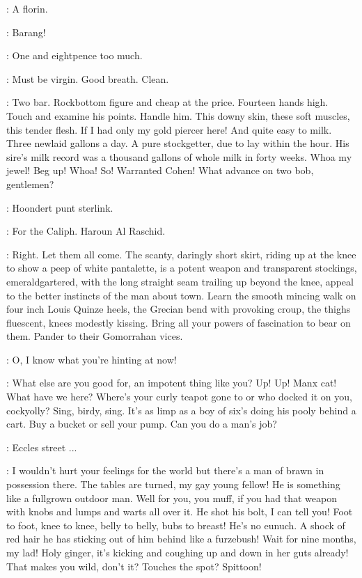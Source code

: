 \Bidder:
A florin.


\Lacquey:
Barang!

\Voice:
One and eightpence too much.

\Marsh:
Must be virgin.
Good breath.
Clean.

\Bello:
Two bar.
Rockbottom figure and cheap at the price.
Fourteen hands high.
Touch and examine his points.
Handle him.
This downy skin, these soft muscles, this tender flesh.
If I had only my gold piercer here!
And quite easy to milk.
Three newlaid gallons a day.
A pure stockgetter, due to lay within the hour.
His sire's milk record was a thousand gallons of whole milk in forty weeks.
Whoa my jewel!
Beg up!
Whoa!
So!
Warranted Cohen!
What advance on two bob, gentlemen?

\DarkvisagedMan:
Hoondert punt sterlink.

\Voices:
For the Caliph.
Haroun Al Raschid.

\Bello:
Right.
Let them all come.
The scanty, daringly short skirt,
riding up at the knee to show a peep of white pantalette,
is a potent weapon and transparent stockings, emeraldgartered,
with the long straight seam trailing up beyond the knee,
appeal to the better instincts of the  man about town.
Learn the smooth mincing walk on four inch Louis Quinze heels,
the Grecian bend with provoking croup,
the thighs fluescent, knees modestly kissing.
Bring all your powers of fascination to bear on them.
Pander to their Gomorrahan vices.

\Bloom:
O, I know what you're hinting at now!

\Bello:
What else are you good for, an impotent thing like you?
Up! Up!
Manx cat!
What have we here?
Where's your curly teapot gone to or who docked it on you, cockyolly?
Sing, birdy, sing.
It's as limp as a boy of six's doing his pooly behind a cart.
Buy a bucket or sell your pump.
Can you do a man's job?

\Bloom:
Eccles street ...

\Bello:
I wouldn't hurt your feelings for the world
but there's a man of brawn in possession there.
The tables are turned, my gay young fellow!
He is something like a fullgrown outdoor man.
Well for you, you muff, if you had that weapon
with knobs and lumps and warts all over it.
He shot his bolt, I can tell you!
Foot to foot, knee to knee, belly to belly, bubs to breast!
He's no eunuch.
A shock of red hair he has sticking out of him behind like a furzebush!
Wait for nine months, my lad!
Holy ginger, it's kicking and coughing up and down in her guts already!
That makes you wild, don't it?
Touches the spot?
Spittoon!

